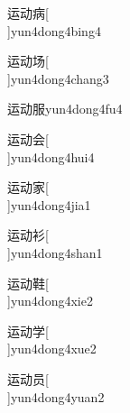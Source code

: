 \begin{verbete}[7;6;10]{运动病}[\\]{yun4dong4bing4}
\end{verbete}

\begin{verbete}[7;6;6]{运动场}[\\]{yun4dong4chang3}
\end{verbete}

\begin{verbete}[7;6;8]{运动服}{yun4dong4fu4}
\end{verbete}

\begin{verbete}[7;6;6]{运动会}[\\]{yun4dong4hui4}
\end{verbete}

\begin{verbete}[7;6;10]{运动家}[\\]{yun4dong4jia1}
\end{verbete}

\begin{verbete}[7;6;8]{运动衫}[\\]{yun4dong4shan1}
\end{verbete}

\begin{verbete}[7;6;15]{运动鞋}[\\]{yun4dong4xie2}
\end{verbete}

\begin{verbete}[7;6;8]{运动学}[\\]{yun4dong4xue2}
\end{verbete}

\begin{verbete}[7;6;7]{运动员}[\\]{yun4dong4yuan2}
\end{verbete}

